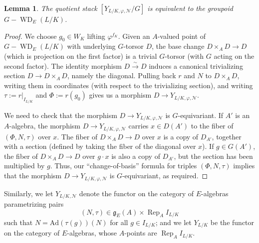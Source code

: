 \documentclass{amsart}
\def\Ad{\mathrm{Ad}}
\def\fg{\mathfrak{g}}
\newcommand{\Rep}{\operatorname{Rep}}
\newtheorem{lemma}[subsubsection]{Lemma}
\theoremstyle{definition}
\theoremstyle{remark}
\newcommand{\mar}[1]{}
\newcommand{\mar}[1]{\marginpar{\raggedright\tiny squirrel #1}}
\DeclareMathOperator{\WD}{WD}
\begin{document}
\begin{lemma}\label{lem: stack quotient for G modules}
The quotient stack $[Y_{L/K,\varphi,\mathcal N}/G]$ is equivalent to the groupoid~$ G-\WD_E(L/K)$.
\end{lemma}
\begin{proof}
We choose $g_0\in W_K$ lifting $\varphi^{f_K}$.  
 Given an $A$-valued point of $G-\WD_E(L/K)$ with
  underlying $G$-torsor $D$, the base change
  $D\times_AD\rightarrow D$ (which is projection on the first factor)
  is a trivial $G$-torsor (with
  $G$ acting on the second factor).  The identity
  morphism $D\xrightarrow{\sim}D$ induces a canonical trivializing
  section $D\rightarrow D\times_AD$, namely the diagonal.  Pulling
  back $r$ and $N$ to $D\times_AD$,
  writing them in coordinates (with respect to the trivializing
  section), and writing $\tau:=r|_{I_{L/K}}$ and $\Phi:=r(g_0)$ gives us a morphism $D\rightarrow Y_{L/K,\varphi,\mathcal N}$.

  We need to check that the morphism $D\rightarrow Y_{L/K,\varphi,\mathcal N}$
  is $G$-equivariant.  If $A'$ is an $A$-algebra,
  the morphism $D\rightarrow Y_{L/K,\varphi,\mathcal N}$ carries $x\in D(A')$
  to the fiber of $(\Phi,N,\tau)$ over $x$.  The fiber of
  $D\times_AD\rightarrow D$ over $x$ is a copy of $D_{A'}$, together
  with a section (defined by taking the fiber of the diagonal over
  $x$).  If $g\in G(A')$, the fiber of
  $D\times_AD\rightarrow D$ over $g\cdot x$ is also a copy of
  $D_{A'}$, but the section has been multiplied by $g$.  Thus, our
  ``change-of-basis'' formula for triples
  $(\Phi,N,\tau)$ implies that the morphism
  $D\rightarrow Y_{L/K,\varphi,\mathcal N}$ is
  $G$-equivariant, as required.
\end{proof}

Similarly, we let $Y_{L/K,\mathcal N}$ denote the functor on the category of
$E$-algebras parametrizing pairs \[ (N,\tau)\in \fg_E(A)\times\Rep_A I_{L/K} \] such that
$N={\Ad}(\tau(g))(N)$ for all $g\in I_{L/K}$; and we let $Y_{L/K}$ be the functor on the category of $E$-algebras,
whose $A$-points are $\Rep_A I_{L/K}$.%
\end{document}
